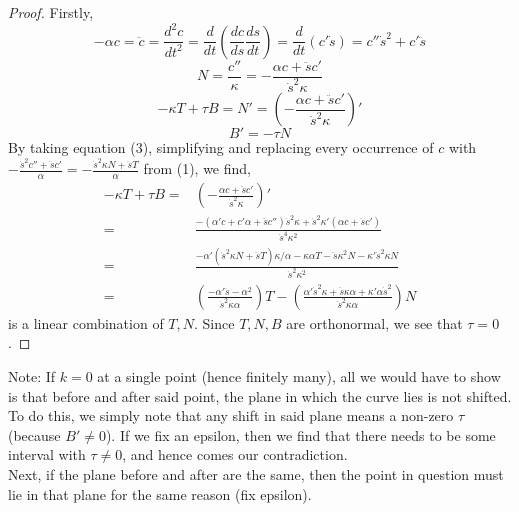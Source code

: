 \documentclass[12pt]{amsart}
\begin{document}
\begin{proof}
Firstly,
\begin{equation}
	-\alpha c=\ddot c=\frac{d^2c}{dt^2}=\frac{d}{dt}\left(\frac{dc}{ds}\frac{ds}{dt}\right)=\frac{d}{dt}\left(c'\dot s\right)=c''\dot s^2+c'\ddot s%
\end{equation}
\begin{equation}
	N=\frac{c''}{\kappa}=-\frac{\alpha c+\ddot sc'}{\dot s^2\kappa}
\end{equation}
\begin{equation}
	-\kappa T+\tau B=N'=\left(-\frac{\alpha c+\ddot sc'}{\dot s^2\kappa}\right)'
\end{equation}
\begin{equation}
	B'=-\tau N
\end{equation}
By taking equation (3), simplifying and replacing every occurrence of $c$ with $-\frac{\dot s^2c''+\ddot sc'}{\alpha}=-\frac{\dot s^2\kappa N+\ddot sT}{\alpha}$ from (1), we find, 
\begin{align*}
	-\kappa T+\tau B=&\left(-\frac{\alpha c+\ddot sc'}{\dot s^2\kappa}\right)'
	\\=&\frac{-(\alpha'c+c'\alpha+\ddot sc'')\dot s^2\kappa+\dot s^2\kappa'(\alpha c+\ddot sc')}{\dot s^4\kappa^2}
	\\=&\frac{-\alpha'(\dot s^2\kappa N+\ddot sT)\kappa/\alpha-\kappa\alpha T-\ddot s\kappa^2N-\kappa'\dot s^2\kappa N}{\dot s^2\kappa^2}
	\\=&\left(\frac{-\alpha'\ddot s-\alpha^2}{\dot s^2\kappa\alpha}\right)T-\left(\frac{\alpha'\dot s^2\kappa+\ddot s\kappa\alpha+\kappa'\alpha\dot s^2}{\dot s^2\kappa\alpha}\right)N
\end{align*}
is a linear combination of $T, N$. Since $T,N,B$ are orthonormal, we see that $\tau=0$.
\end{proof}
Note: If $k=0$ at a single point (hence finitely many), all we would have to show is that before and after said point, the plane in which the curve lies is not shifted. To do this, we simply note that any shift in said plane means a non-zero $\tau$ (because $B'\neq0$). If we fix an epsilon, then we find that there needs to be some interval with $\tau\neq0$, and hence comes our contradiction.
\\Next, if the plane before and after are the same, then the point in question must lie in that plane for the same reason (fix epsilon).
\end{document}
